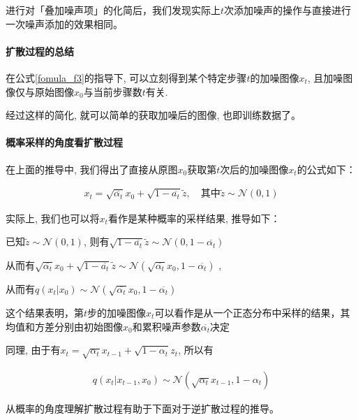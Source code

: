 进行对「叠加噪声项」的化简后，我们发现实际上$t$次添加噪声的操作与直接进行一次噪声添加的效果相同。

\paragraph{扩散过程的总结}

在公式\ref{fomula_f3}的指导下, 可以立刻得到某个特定步骤$t$的加噪图像$x_t$, 且加噪图像仅与原始图像$x_0$与当前步骤数$t$有关.

经过这样的简化, 就可以简单的获取加噪后的图像, 也即训练数据了。

\paragraph{概率采样的角度看扩散过程}
\label{sec_prob}
在上面的推导中, 我们得出了直接从原图$x_0$获取第$t$次后的加噪图像$x_t$的公式如下：

\begin{equation}
    \begin{aligned}
        \label{fomula_f4}
        x_t= \sqrt{\overline{\alpha_t}}x_0 + \sqrt{1-\overline{a_t}}\widetilde{z},\quad \text{其中}\widetilde{z}\sim\mathcal{N}(0,1)
    \end{aligned}
\end{equation}

实际上, 我们也可以将$x_t$看作是某种概率的采样结果, 推导如下：

已知$\widetilde{z}\sim\mathcal{N}(0,1)$, 则有$\sqrt{1-\overline{a_t}}\widetilde{z}\sim\mathcal{N}(0,1-\overline{\alpha_t})$

从而有$\sqrt{\overline{\alpha_t}}x_0 + \sqrt{1-\overline{a_t}}\widetilde{z}\sim\mathcal{N}(\sqrt{\overline{\alpha_t}}x_0,1-\overline{\alpha_t})$ , 

从而有$q(x_t\vert x_0)\sim \mathcal{N}(\sqrt{\overline{\alpha_t}}x_0,1-\overline{\alpha_t})$

这个结果表明，第$t$步的加噪图像$x_t$​可以看作是从一个正态分布中采样的结果，其均值和方差分别由初始图像$x_0$和累积噪声参数$\overline{\alpha_t}$​决定

同理, 由于有$x_t = \sqrt{\alpha_t}x_{t-1}+\sqrt{1-\alpha_t}z_t$, 所以有 

\begin{equation}
    \begin{aligned}
        q(x_t|x_{t-1},x_0)\sim \mathcal{N}(\sqrt{\alpha_t}x_{t-1}, 1-\alpha_t)
    \end{aligned}
\end{equation}


从概率的角度理解扩散过程有助于下面对于逆扩散过程的推导。